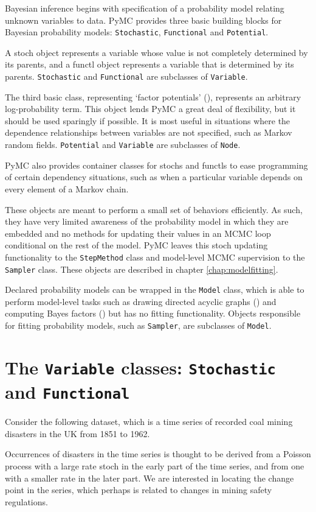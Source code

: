 
Bayesian inference begins with specification of a probability model relating unknown variables to data. PyMC provides three basic building blocks for Bayesian probability models: \texttt{Stochastic}, \texttt{Functional} and \texttt{Potential}. 

A stoch object represents a variable whose value is not completely determined by its parents, and a functl object represents a variable that is determined by its parents. \texttt{Stochastic} and \texttt{Functional} are subclasses of \texttt{Variable}.

The third basic class, representing `factor potentials' (\cite{dawidmarkov,jordangraphical}), represents an arbitrary log-probability term. This object lends PyMC a great deal of flexibility, but it should be used sparingly if possible. It is most useful in situations where the dependence relationships between variables are not specified, such as Markov random fields. \texttt{Potential} and \texttt{Variable} are subclasses of \texttt{Node}.

PyMC also provides container classes for stochs and functls to ease programming of certain dependency situations, such as when a particular variable depends on every element of a Markov chain.

These objects are meant to perform a small set of behaviors efficiently. As such, they have very limited awareness of the probability model in which they are embedded and no methods for updating their values in an MCMC loop conditional on the rest of the model. PyMC leaves this stoch updating functionality to the \texttt{StepMethod} class and model-level MCMC supervision to the \texttt{Sampler} class. These objects are described in chapter \ref{chap:modelfitting}. 

Declared probability models can be wrapped in the \texttt{Model} class, which is able to perform model-level tasks such as drawing directed acyclic graphs (\cite{dawidmarkov,jordangraphical}) and computing Bayes factors (\cite{gelman}) but has no fitting functionality. Objects responsible for fitting probability models, such as \texttt{Sampler}, are subclasses of \texttt{Model}.

\section{The \texttt{Variable} classes: \texttt{Stochastic} and \texttt{Functional}}
Consider the following dataset, which is a time series of recorded coal mining disasters in the UK from 1851 to 1962.
\begin{center}
\end{center}
Occurrences of disasters in the time series is thought to be derived from a Poisson process with a large rate stoch in the early part of the time series, and from one with a smaller rate in the later part. We are interested in locating the change point in the series, which perhaps is related to changes in mining safety regulations.

